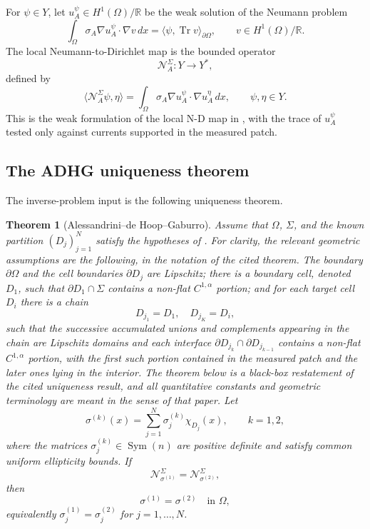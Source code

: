 \documentclass[12pt,oneside]{amsart}
\newtheorem{theorem}{Theorem}[section]
\newcommand{\R}{\mathbb R}
\newcommand{\cN}{\mathcal N}
\newcommand{\Sym}{\operatorname{Sym}}
\newcommand{\Tr}{\operatorname{Tr}}
\newcommand{\dual}[2]{\langle #1,#2\rangle}
\begin{document}
For $\psi\in Y$, let $u_A^\psi\in H^1(\Omega)/\R$ be the weak solution of the Neumann problem
\[
        \int_\Omega \sigma_A\nabla u_A^\psi\cdot\nabla v\,dx
        =\dual{\psi}{\Tr v}_{\partial\Omega},
        \qquad v\in H^1(\Omega)/\R .
\]
The local Neumann-to-Dirichlet map is the bounded operator
\[
        \cN_A^\Sigma:Y\to Y^*,
\]
defined by
\[
        \dual{\cN_A^\Sigma\psi}{\eta}
        =\int_\Omega \sigma_A\nabla u_A^\psi\cdot\nabla u_A^\eta\,dx,
        \qquad \psi,\eta\in Y .
\]
This is the weak formulation of the local N-D map in \cite[Definition 2.6]{AlessandriniDeHoopGaburro2017}, with the trace of $u_A^\psi$ tested only against currents supported in the measured patch.


\subsection{The ADHG uniqueness theorem}\label{subsec:cond-uniqueness}

The inverse-problem input is the following uniqueness theorem.

\begin{theorem}[Alessandrini--de Hoop--Gaburro]\label{thm:ADHG-blackbox}
Assume that $\Omega$, $\Sigma$, and the known partition $(D_j)_{j=1}^N$ satisfy the hypotheses of \cite[Theorem 2.1]{AlessandriniDeHoopGaburro2017}.  For clarity, the relevant geometric assumptions are the following, in the notation of the cited theorem.  The boundary $\partial\Omega$ and the cell boundaries $\partial D_j$ are Lipschitz; there is a boundary cell, denoted $D_1$, such that $\partial D_1\cap\Sigma$ contains a non-flat $C^{1,\alpha}$ portion; and for each target cell $D_i$ there is a chain
\[
        D_{j_1}=D_1,
        \quad D_{j_K}=D_i,
\]
such that the successive accumulated unions and complements appearing in the chain are Lipschitz domains and each interface $\partial D_{j_k}\cap\partial D_{j_{k-1}}$ contains a non-flat $C^{1,\alpha}$ portion, with the first such portion contained in the measured patch and the later ones lying in the interior.  The theorem below is a black-box restatement of the cited uniqueness result, and all quantitative constants and geometric terminology are meant in the sense of that paper.  Let
\[
        \sigma^{(k)}(x)=\sum_{j=1}^N \sigma_j^{(k)}\chi_{D_j}(x),
        \qquad k=1,2,
\]
where the matrices $\sigma_j^{(k)}\in\Sym(n)$ are positive definite and satisfy common uniform ellipticity bounds.  If
\[
        \cN_{\sigma^{(1)}}^\Sigma=\cN_{\sigma^{(2)}}^\Sigma,
\]
then
\[
        \sigma^{(1)}=\sigma^{(2)}\quad\text{in }\Omega,
\]
equivalently $\sigma_j^{(1)}=\sigma_j^{(2)}$ for $j=1,\ldots,N$.
\end{theorem}
\end{document}
